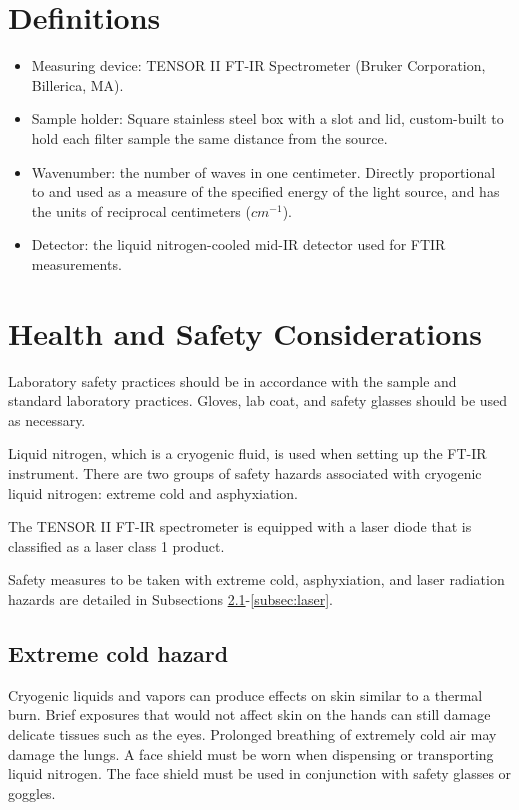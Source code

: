 \documentclass[12pt]{article}
\begin{document}
\section{Definitions}
\begin{itemize}
    \item Measuring device: TENSOR II FT-IR Spectrometer (Bruker Corporation, Billerica, MA).
    \item Sample holder: Square stainless steel box with a slot and lid, custom-built to hold each filter sample the same distance from the source.
    \item Wavenumber: the number of waves in one centimeter. Directly proportional to and used as a measure of the specified energy of the light source, and has the units of reciprocal centimeters ($cm^{-1}$).
    \item Detector: the liquid nitrogen-cooled mid-IR detector used for FTIR measurements.
\end{itemize}

\section{Health and Safety Considerations}
Laboratory safety practices should be in accordance with the sample and standard laboratory practices. Gloves, lab coat, and safety glasses should be used as necessary.

Liquid nitrogen, which is a cryogenic fluid, is used when setting up the FT-IR instrument. There are two groups of safety hazards associated with cryogenic liquid nitrogen: extreme cold and asphyxiation.

The TENSOR II FT-IR spectrometer is equipped with a laser diode that is classified as a laser class 1 product\cite{Bruker1}.

Safety measures to be taken with extreme cold, asphyxiation, and laser radiation hazards are detailed in Subsections \ref{subsec:cold}-\ref{subsec:laser}.

\subsection{Extreme cold hazard}
\label{subsec:cold}
Cryogenic liquids and vapors can produce effects on skin similar to a thermal burn. Brief exposures that would not affect skin on the hands can still damage delicate tissues such as the eyes. Prolonged breathing of extremely cold air may damage the lungs. A face shield must be worn when dispensing or transporting liquid nitrogen. The face shield must be used in conjunction with safety glasses or goggles. 
\end{document}
